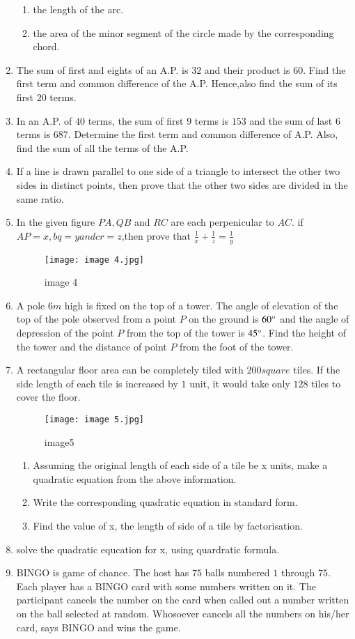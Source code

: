 \documentclass[12pt,-letter paper]{article}
\begin{document}
\begin{enumerate}
\begin{enumerate}
\item the length of the arc.
\item the area of the minor segment of the circle made by the corresponding chord.
\end{enumerate}
\item  The sum of first and eights of an A.P. is $32$ and their product is $60$. Find the first term  and common difference of the A.P. Hence,also find the sum of its first $20$ terms.
\item In an A.P. of $40$ terms, the sum of first $9$ terms is $153$ and the sum of last $6$ terms is $687$. Determine the first term and common difference of A.P. Also, find the sum of all the terms of the A.P.
\item If a line is drawn parallel to one side of a triangle to intersect the other two sides in distinct points, then prove that the other two sides are divided in the same ratio.
\item In the given figure $PA,QB$ and $RC$ are each perpenicular to $AC$. if $AP = x,bq=y and cr =z$,then prove that $\frac{1}{x} + \frac{1}{z} = \frac{1}{y}$                                               
\begin{figure}[!ht]
\centering
\texttt{[image: image 4.jpg]}
\label{fig:image 4}
\caption{image 4}
\end{figure}
\newpage
\item A pole $6m$ high is fixed on the top of a tower. The angle of elevation of the top of the pole observed from a point $P$ on the ground is $60\degree$ and the angle of depression of the point $P$ from the top of the tower is $45\degree$. Find the height of the tower and the distance of point $P$ from the foot of the tower.
\newpage
\item A rectangular floor area can be completely tiled with $200square$ tiles. If the side length of each tile is increased by $1$ unit, it would take only $128$ tiles to cover the floor.
\begin{figure}[!ht]
\centering
\texttt{[image: image 5.jpg]}
\label{fig:image5}
\caption{image5} 
\end{figure}
\begin{enumerate}
\item Assuming the original length of each side of a tile be x units, make a quadratic equation from the above information.\
\item Write the corresponding quadratic equation in standard form.\
\item Find the value of x, the length of side of a tile by factorisation.
\end{enumerate}
\item solve the quadratic equcation for x, using quardratic formula.
\newpage
\item BINGO is game of chance. The host has $75$ balls numbered $1$ through $75$. Each player has a BINGO card with some numbers written on it.
The participant cancels the number on the card when called out a number written on the ball selected at random. Whosoever cancels all the numbers on his/her card, says BINGO and wins the game.


\end{enumerate}
\end{document}
